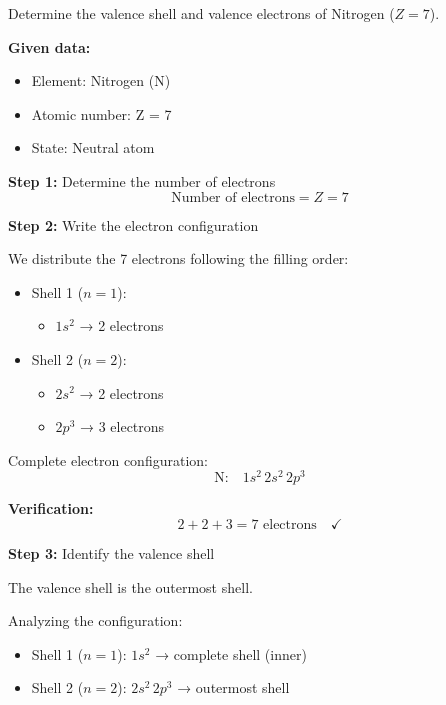 \begin{exercise}
    Determine the valence shell and valence electrons of Nitrogen (\( Z = 7 \)).
    \begin{solu}
        \textbf{Given data:}
        \begin{itemize}
            \item Element: Nitrogen (N)
            \item Atomic number: Z = 7
            \item State: Neutral atom
        \end{itemize}

        \textbf{Step 1:} Determine the number of electrons
        \[
            \text{Number of electrons} = Z = 7
        \]

        \textbf{Step 2:} Write the electron configuration

        We distribute the 7 electrons following the filling order:
        \begin{itemize}
            \item Shell 1 (\(n = 1\)):
            \begin{itemize}
                \item \(1s^2\) → 2 electrons
            \end{itemize}
            \item Shell 2 (\(n = 2\)):
            \begin{itemize}
                \item \(2s^2\) → 2 electrons
                \item \(2p^3\) → 3 electrons
            \end{itemize}
        \end{itemize}

        Complete electron configuration:
        \[
            \text{N:} \quad 1s^2 \, 2s^2 \, 2p^3
        \]

        \textbf{Verification:}
        \[
            2 + 2 + 3 = 7 \text{ electrons} \quad \checkmark
        \]

        \textbf{Step 3:} Identify the valence shell

        The valence shell is the outermost shell.

        Analyzing the configuration:
        \begin{itemize}
            \item Shell 1 (\(n = 1\)): \(1s^2\) → complete shell (inner)
            \item Shell 2 (\(n = 2\)): \(2s^2 \, 2p^3\) → outermost shell
        \end{itemize}


\end{solu}
\end{exercise}
